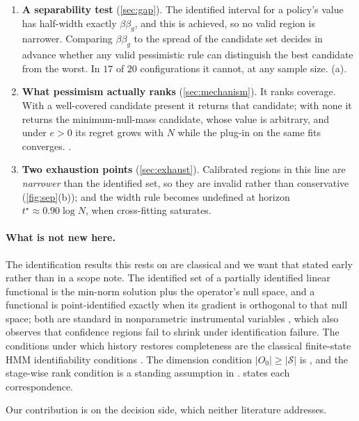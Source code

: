 \documentclass{article}
\theoremstyle{plain}
\theoremstyle{definition}
\begin{document}
\begin{enumerate}
\itemsep2pt
\item \textbf{A separability test} (\cref{sec:gap}). The identified interval for a
  policy's value has half-width exactly $\beta\beta_g$, and this is achieved, so
  no valid region is narrower. Comparing $\beta\beta_g$ to the spread of the
  candidate set decides in advance whether any valid pessimistic rule can
  distinguish the best candidate from the worst. In $17$ of $20$ configurations
  it cannot, at any sample size. (a).

\item \textbf{What pessimism actually ranks} (\cref{sec:mechanism}). It ranks
  coverage. With a well-covered candidate present it returns that candidate; with
  none it returns the minimum-null-mass candidate, whose value is arbitrary, and
  under $e>0$ its regret grows with $N$ while the plug-in on the same fits
  converges. .

\item \textbf{Two exhaustion points} (\cref{sec:exhaust}). Calibrated regions in
  this line are \emph{narrower} than the identified set, so they are invalid
  rather than conservative (\cref{fig:sep}(b)); and the width rule becomes
  undefined at horizon $t^{\star}\approx 0.90\log N$, when cross-fitting
  saturates.
\end{enumerate}

\paragraph{What is not new here.}
The identification results this rests on are classical and we want that stated
early rather than in a scope note. The identified set of a partially identified
linear functional is the min-norm solution plus the operator's null space, and a
functional is point-identified exactly when its gradient is orthogonal to that
null space; both are standard in nonparametric instrumental variables
\citep{florens2018,severini2012,santos2011}, which also observes that confidence
regions fail to shrink under identification failure. The conditions under which
history restores completeness are the classical finite-state HMM identifiability
conditions \citep{allman2009,gassiat2016}. The dimension condition
$|O_0|\ge|\mathcal{S}|$ is \citet[eq.~6]{ying2023}, and the stage-wise rank
condition is a standing assumption in \citet{zhang2024}.  states
each correspondence.

Our contribution is on the decision side, which neither literature addresses.
\end{document}
